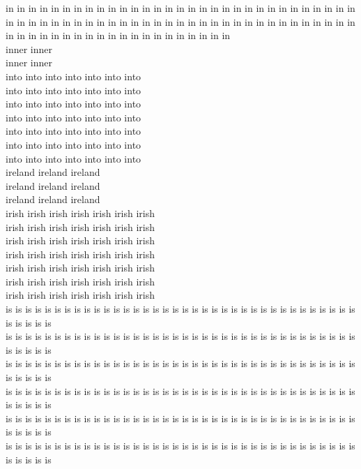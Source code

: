in in in in in in in in in in in in in in in in in in in in in in in in in in in in in in in in in in in in in in in in in in in in in in in in in in in in in in in in in in in in in in in in in in in in in in in in in in in in in in in in in in\\
inner inner\\
inner inner\\
into into into into into into into\\
into into into into into into into\\
into into into into into into into\\
into into into into into into into\\
into into into into into into into\\
into into into into into into into\\
into into into into into into into\\
ireland ireland ireland\\
ireland ireland ireland\\
ireland ireland ireland\\
irish irish irish irish irish irish irish\\
irish irish irish irish irish irish irish\\
irish irish irish irish irish irish irish\\
irish irish irish irish irish irish irish\\
irish irish irish irish irish irish irish\\
irish irish irish irish irish irish irish\\
irish irish irish irish irish irish irish\\
is is is is is is is is is is is is is is is is is is is is is is is is is is is is is is is is is is is is is is is is is\\
is is is is is is is is is is is is is is is is is is is is is is is is is is is is is is is is is is is is is is is is is\\
is is is is is is is is is is is is is is is is is is is is is is is is is is is is is is is is is is is is is is is is is\\
is is is is is is is is is is is is is is is is is is is is is is is is is is is is is is is is is is is is is is is is is\\
is is is is is is is is is is is is is is is is is is is is is is is is is is is is is is is is is is is is is is is is is\\
is is is is is is is is is is is is is is is is is is is is is is is is is is is is is is is is is is is is is is is is is\\
